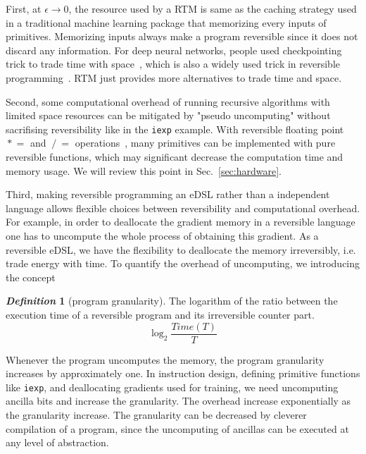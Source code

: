 \documentclass[aps,twocolumn,longbibliography,english,superscriptaddress]{revtex4-1}
\newcommand{\<}{\langle}
\renewcommand{\>}{\rangle}
\newcommand{\Sec}[1]{Sec.~\ref{#1}}
\theoremstyle{definition}\newtheorem{definition}{\textit{Definition}}
\begin{document}
First, at $\epsilon \rightarrow 0$, the resource used by a RTM is same as the caching strategy used in a traditional machine learning package that memorizing every inputs of primitives. Memorizing inputs always make a program reversible since it does not discard any information.
For deep neural networks, people used checkpointing trick to trade time with space~\cite{Chen2016}, which is also a widely used trick in reversible programming~\cite{Perumalla2013}. RTM just provides more alternatives to trade time and space.

Second, some computational overhead of running recursive algorithms with limited space resources can be mitigated by "pseudo uncomputing" without sacrifising reversibility like in the \texttt{iexp} example. With reversible floating point $\mathrel{*}=$ and $\mathrel{/}=$ operations~\cite{Hner2018}, many primitives can be implemented with pure reversible functions, which may significant decrease the computation time and memory usage. We will review this point in \Sec{sec:hardware}.

Third, making reversible programming an eDSL rather than a independent language allows flexible choices between reversibility and computational overhead. For example, in order to deallocate the gradient memory in a reversible language one has to uncompute the whole process of obtaining this gradient.
As a reversible eDSL, we have the flexibility to deallocate the memory irreversibly, i.e. trade energy with time. To quantify the overhead of uncomputing, we introducing the concept
\begin{definition}[program granularity]
    The logarithm of the ratio between the execution time of a reversible program and its irreversible counter part.
    \begin{equation}
        \log_2 \frac{Time(T)}{T}
    \end{equation}
\end{definition}
Whenever the program uncomputes the memory, the program granularity increases by approximately one. In instruction design, defining primitive functions like \texttt{iexp}, and deallocating gradients used for training, we need uncomputing ancilla bits and increase the granularity. The overhead increase exponentially as the granularity increase.
The granularity can be decreased by cleverer compilation of a program, since the uncomputing of ancillas can be executed at any level of abstraction.
\end{document}

